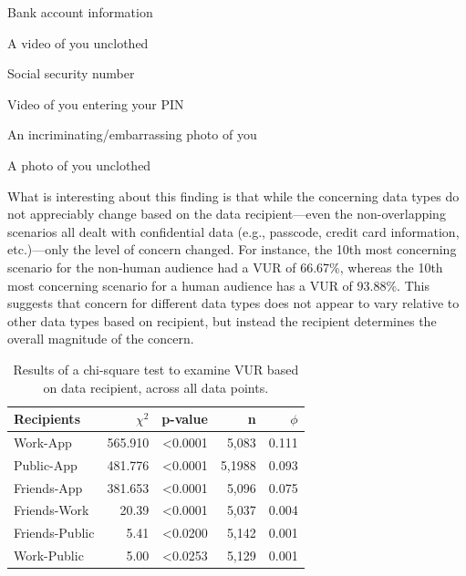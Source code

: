 \documentclass{acm_proc_article-sp}
\newenvironment{packed_enum}{
\begin{enumerate}
  \setlength{\itemsep}{1pt}
  \setlength{\parskip}{0pt}
  \setlength{\parsep}{0pt}
}{\end{enumerate}}
\begin{document}
\begin{packed_enum}
\item Bank account information
\item A video of you unclothed
\item Social security number
\item Video of you entering your PIN
\item An incriminating/embarrassing photo of you
\item A photo of you unclothed \\[-.8cm]
\end{packed_enum}

What is interesting about this finding is that while the concerning data types do not appreciably change based on the data recipient---even the non-overlapping scenarios all dealt with confidential data (e.g., passcode, credit card information, etc.)---only the level of concern changed. For instance, the 10th most concerning scenario for the non-human audience had a VUR of 66.67\%, whereas the 10th most concerning scenario for a human audience has a VUR of 93.88\%. This suggests that concern for different data types does not appear to vary relative to other data types based on recipient, but instead the recipient determines the overall magnitude of the concern.



\begin{table}[t]
\begin{center}
\begin{tabular}{|l|r|r|r|r|}
\hline
Recipients	& $\chi^2$ & p-value 	& n & $\phi$ \\
\hline
Work-App	& 565.910 & <0.0001 & 5,083 & 0.111\\
Public-App	& 481.776 & <0.0001 & 5,1988& 0.093\\
Friends-App & 381.653 & <0.0001 & 5,096 & 0.075\\
Friends-Work & 20.39 & <0.0001 & 5,037 & 0.004\\
Friends-Public & 5.41 & <0.0200 & 5,142 & 0.001\\
Work-Public&  5.00 & <0.0253 & 5,129	& 0.001\\
\hline
\end{tabular}
\caption{Results of a chi-square test to examine VUR based on data recipient, across all data points.}
\label{recipient}
\end{center}
\end{table}
\end{document}
